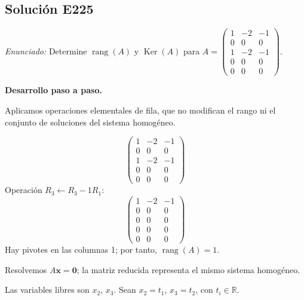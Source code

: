\documentclass[12pt]{article}
\theoremstyle{remark}
\newcommand{\rang}{\operatorname{rang}}
\newcommand{\Ker}{\operatorname{Ker}}
\newcommand{\vect}[1]{\boldsymbol{#1}}
\newcommand{\solucion}[2]{\Needspace{11\baselineskip}\subsection*{Solución E#1}\noindent\textit{Enunciado:} #2\par\medskip\noindent\textbf{Desarrollo paso a paso.}\par\medskip}
\begin{document}
\medskip

\solucion{225}{Determine $\rang(A)$ y $\Ker(A)$ para $A=\begin{pmatrix}1&-2&-1\\0&0&0\\1&-2&-1\\0&0&0\\0&0&0\end{pmatrix}$.}
Aplicamos operaciones elementales de fila, que no modifican el rango ni el conjunto de soluciones del sistema homogéneo.

\[
\begin{pmatrix}1&-2&-1\\0&0&0\\1&-2&-1\\0&0&0\\0&0&0\end{pmatrix}
\]
Operación $R_{3}\leftarrow R_{3}-1R_{1}$:
\[
\begin{pmatrix}1&-2&-1\\0&0&0\\0&0&0\\0&0&0\\0&0&0\end{pmatrix}
\]
Hay pivotes en las columnas 1; por tanto, $\boxed{\rang(A)=1}$.

Resolvemos $A\vect x=\vect0$; la matriz reducida representa el mismo sistema homogéneo.

Las variables libres son $x_{2}$, $x_{3}$. Sean $x_{2}=t_{1}$, $x_{3}=t_{2}$, con $t_i\in\mathbb R$.
\end{document}
